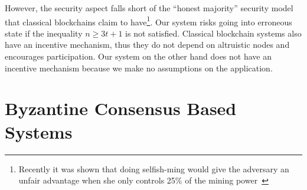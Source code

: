 However, the security aspect falls short of the ``honest majority'' security model that classical blockchains claim to 
have\footnote{Recently it was shown that doing selfish-ming would give the adversary an unfair advantage when she only controls 25\% of the mining power~\cite{eyal2014majority}}.
Our system risks going into erroneous state if the inequality $n \ge 3t + 1$ is not satisfied.
Classical blockchain systems also have an incentive mechanism, thus they do not depend on altruistic nodes and encourages participation.
Our system on the other hand does not have an incentive mechanism because we make no assumptions on the application.

\section{Byzantine Consensus Based Systems}

